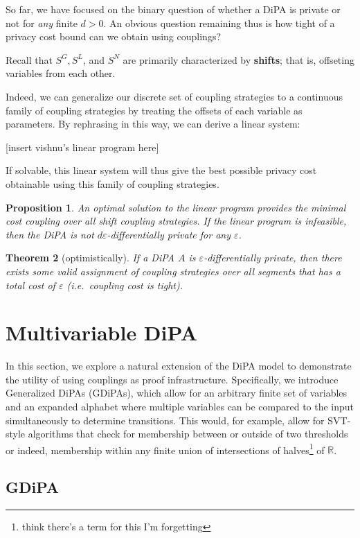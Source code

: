 \documentclass[12pt]{article}
\newcommand{\RR}{\mathbb{R}}
\newtheorem{thm}{Theorem}[section]
\newtheorem{prop}[thm]{Proposition}
\theoremstyle{definition}
\begin{document}
So far, we have focused on the binary question of whether a DiPA is private or not for \textit{any} finite $d>0$. An obvious question remaining thus is how tight of a privacy cost bound can we obtain using couplings?

Recall that $S^G, S^L$, and $S^N$ are primarily characterized by \textbf{shifts}; that is, offseting variables from each other.

Indeed, we can generalize our discrete set of coupling strategies to a continuous family of coupling strategies by treating the offsets of each variable as parameters. By rephrasing in this way, we can derive a linear system:

[insert vishnu's linear program here]

If solvable, this linear system will thus give the best possible privacy cost obtainable using this family of coupling strategies. 

\begin{prop}
    An optimal solution to the linear program provides the minimal cost coupling over all shift coupling strategies. If the linear program is infeasible, then the DiPA is not $d\varepsilon$-differentially private for any $\varepsilon$. 
\end{prop}

\begin{thm}[optimistically]
    If a DiPA $A$ is $\varepsilon$-differentially private, then there exists some valid assignment of coupling strategies over all segments that has a total cost of $\varepsilon$ (i.e.\ coupling cost is tight). 
\end{thm}

\section{Multivariable DiPA}

In this section, we explore a natural extension of the DiPA model to demonstrate the utility of using couplings as proof infrastructure. Specifically, we introduce Generalized DiPAs (GDiPAs), which allow for an arbitrary finite set of variables and an expanded alphabet where multiple variables can be compared to the input simultaneously to determine transitions. 
This would, for example, allow for SVT-style algorithms that check for membership between or outside of two thresholds or indeed, membership within any finite union of intersections of halves\footnote{think there's a term for this I'm forgetting} of $\RR$. 

\subsection{GDiPA}
\end{document}
